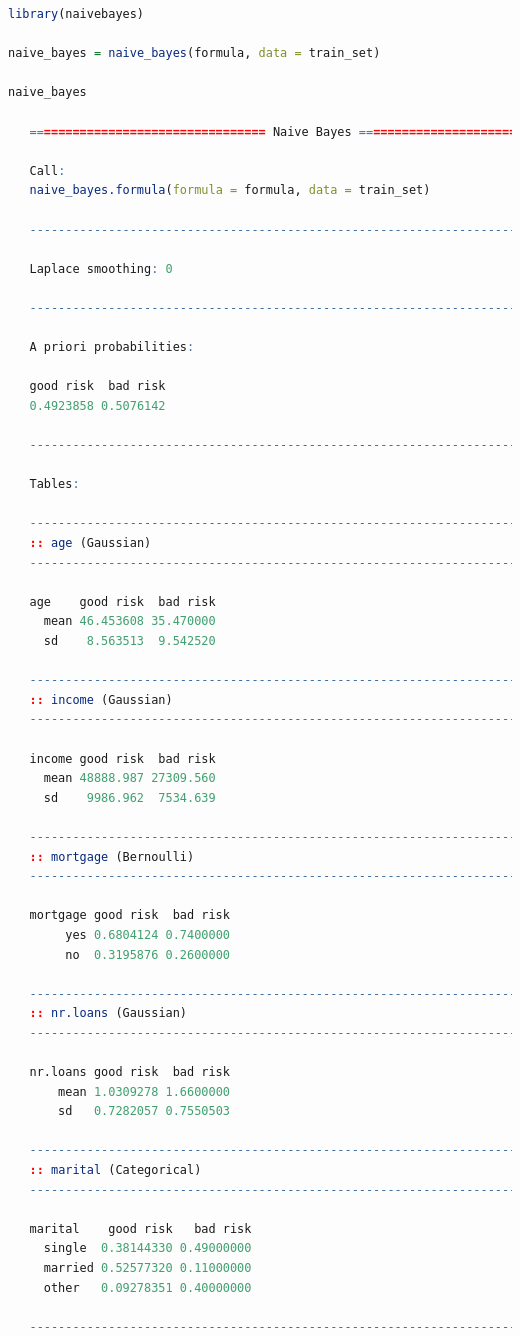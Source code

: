 \documentclass[
  11pt,
]{book}
\theoremstyle{definition}
\theoremstyle{definition}
\theoremstyle{definition}
\theoremstyle{definition}
\theoremstyle{remark}
\begin{document}
\begin{lstlisting}[language=R]
library(naivebayes)

naive_bayes = naive_bayes(formula, data = train_set)

naive_bayes
   
   ================================= Naive Bayes ==================================
   
   Call:
   naive_bayes.formula(formula = formula, data = train_set)
   
   -------------------------------------------------------------------------------- 
    
   Laplace smoothing: 0
   
   -------------------------------------------------------------------------------- 
    
   A priori probabilities: 
   
   good risk  bad risk 
   0.4923858 0.5076142 
   
   -------------------------------------------------------------------------------- 
    
   Tables: 
   
   -------------------------------------------------------------------------------- 
   :: age (Gaussian) 
   -------------------------------------------------------------------------------- 
         
   age    good risk  bad risk
     mean 46.453608 35.470000
     sd    8.563513  9.542520
   
   -------------------------------------------------------------------------------- 
   :: income (Gaussian) 
   -------------------------------------------------------------------------------- 
         
   income good risk  bad risk
     mean 48888.987 27309.560
     sd    9986.962  7534.639
   
   -------------------------------------------------------------------------------- 
   :: mortgage (Bernoulli) 
   -------------------------------------------------------------------------------- 
           
   mortgage good risk  bad risk
        yes 0.6804124 0.7400000
        no  0.3195876 0.2600000
   
   -------------------------------------------------------------------------------- 
   :: nr.loans (Gaussian) 
   -------------------------------------------------------------------------------- 
           
   nr.loans good risk  bad risk
       mean 1.0309278 1.6600000
       sd   0.7282057 0.7550503
   
   -------------------------------------------------------------------------------- 
   :: marital (Categorical) 
   -------------------------------------------------------------------------------- 
            
   marital    good risk   bad risk
     single  0.38144330 0.49000000
     married 0.52577320 0.11000000
     other   0.09278351 0.40000000
   
   --------------------------------------------------------------------------------
\end{lstlisting}
\end{document}
